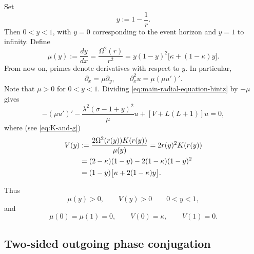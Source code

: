 \documentclass[11pt]{article}
\numberwithin{equation}{section}
\begin{document}
	Set
	\begin{equation}
		y:=1-\frac1r.
		\label{eq:y-compactification}
	\end{equation}
	Then $0<y<1$, with $y=0$ corresponding to the event horizon and $y=1$
	to infinity. Define
	\begin{equation}
		\mu(y):=\frac{dy}{dx}
		=\frac{\Omega^2(r)}{r^2}
		=y(1-y)^2\bigl[\kappa+(1-\kappa)y\bigr].
		\label{eq:mu-explicit}
	\end{equation}
	From now on, primes denote derivatives with respect to $y$.
	In particular,
	\begin{equation}
		\partial_x=\mu\partial_y,
		\qquad \partial_x^2u=\mu(\mu u')'.
		\label{eq:x-to-y-derivatives}
	\end{equation}
	Note that $\mu > 0$ for $0 < y <1$. Dividing \eqref{eq:main-radial-equation-hintz} by ${-}\mu$ gives
	\begin{equation}
		-(\mu u')'-\frac{\lambda^2(\sigma-1+y)^2}{\mu}u+[V+L(L+1)]u=0,
		\label{eq:y-equation}
	\end{equation}
	where (see \eqref{eq:K-and-g})
	\begin{align}
		V(y)&:=\frac{2\Omega^2(r(y))K(r(y))}{\mu(y)}=2r(y)^2K(r(y))\notag\\
		&=(2-\kappa)(1-y)-2(1-\kappa)(1-y)^2\notag\\
		&=(1-y)\bigl[\kappa+2(1-\kappa)y\bigr].
		\label{eq:V-explicit}
	\end{align}
	
	Thus
	\begin{equation}
		\mu(y)>0,\qquad V(y)>0\qquad0<y<1,
		\label{eq:V-positive}
	\end{equation}
	and
	\begin{equation}
		\mu(0)=\mu(1)=0,\qquad V(0)=\kappa,\qquad V(1)=0.
		\label{eq:V-endpoints}
	\end{equation}
	
	\subsection{Two-sided outgoing phase conjugation}\label{section:phase_conj}
	
	
	
\end{document}
